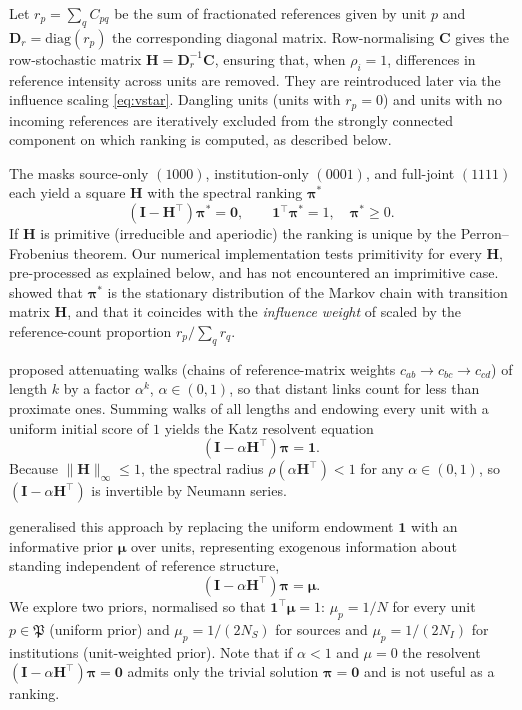 Let $r_p=\sum_q C_{pq}$ be the sum of fractionated references given by unit $p$
and $\mathbf{D}_r=\mathrm{diag}(r_p)$ the corresponding diagonal matrix.
Row-normalising $\mathbf{C}$ gives the row-stochastic matrix
$\mathbf{H}=\mathbf{D}_r^{-1}\mathbf{C}$,
ensuring that, when $\rho_i = 1$, differences in reference intensity across units are
removed. They are reintroduced later
via the influence scaling \eqref{eq:vstar}.
Dangling units (units with $r_p=0$) and units with no incoming references are iteratively excluded from the strongly connected component on which ranking is computed, as described below.

The masks source-only $(1000)$, institution-only $(0001)$, and full-joint $(1111)$
each yield a square $\mathbf{H}$ with the spectral
ranking $\boldsymbol{\pi}^*$ \citep[see][for an overview]{vignaSpectralRanking2016}
\begin{equation}
	(\mathbf{I} - \mathbf{H}^\top)\boldsymbol{\pi}^* = \mathbf{0},
	\qquad
	\mathbf{1}^\top\boldsymbol{\pi}^*=1,
	\quad
	\boldsymbol{\pi}^*\ge 0.
	\label{eq:eig}
\end{equation}
If $\mathbf{H}$ is primitive (irreducible and aperiodic) the ranking is unique by the
Perron--Frobenius theorem. Our numerical implementation tests primitivity
for every $\mathbf{H}$, pre-processed as explained below, and has not encountered an imprimitive case.
\cite{gellerCitationInfluenceMethodology1978} showed that
$\boldsymbol{\pi}^*$ is the stationary distribution of the
Markov chain with transition matrix $\mathbf{H}$, and that it coincides
with the \textit{influence weight} of \cite{pinskiCitationInfluenceJournal1976}
scaled by the reference-count proportion $r_p / \sum_q r_q$.

\cite{katzNewStatusIndex1953} proposed attenuating walks (chains of reference-matrix weights
$c_{ab}\rightarrow c_{bc}\rightarrow c_{cd}$) of length $k$ by a factor $\alpha^k$, $\alpha\in(0,1)$, so that distant
links count for less than proximate ones.
Summing walks of all lengths and endowing every unit with a
uniform initial score of $1$ yields the Katz resolvent equation
\[
	(\mathbf{I} - \alpha\mathbf{H}^\top)\boldsymbol{\pi} = \mathbf{1}.
\]
Because $\|\mathbf{H}\|_\infty\leq 1$, the spectral radius $\rho(\alpha\mathbf{H}^\top)<1$ for any $\alpha\in(0,1)$, so $(\mathbf{I}-\alpha\mathbf{H}^\top)$ is invertible by Neumann series.

\cite{hubbellInputoutputApproachClique1965} generalised this approach by replacing
the uniform endowment $\mathbf{1}$ with an informative prior
$\boldsymbol{\mu}$ over units, representing exogenous information about
standing independent of reference structure,
\[
	(\mathbf{I} - \alpha\mathbf{H}^\top)\boldsymbol{\pi} = \boldsymbol{\mu}.
\]
We explore two priors, normalised so that $\mathbf{1}^\top\boldsymbol{\mu}=1$:
$\mu_p = 1/N$ for every unit $p\in\mathfrak{P}$ (uniform prior) and $\mu_p=1/(2N_S)$ for sources and $\mu_p=1/(2N_I)$ for institutions (unit-weighted prior).
Note that if $\alpha < 1$ and $\mu=0$ the resolvent $(\mathbf{I}-\alpha\mathbf{H}^\top)\boldsymbol{\pi}=\mathbf{0}$ admits only the trivial solution $\boldsymbol{\pi}=\mathbf{0}$ and is not useful as a ranking.

